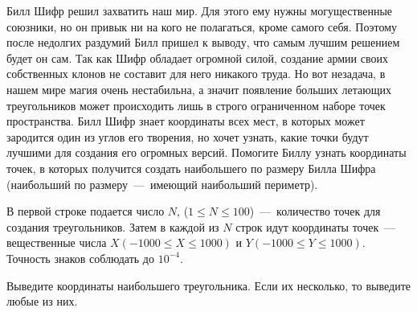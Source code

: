 
Билл Шифр решил захватить наш мир. Для этого ему нужны могущественные союзники, но он привык ни на кого не полагаться, кроме самого себя. Поэтому после недолгих раздумий Билл пришел к выводу, что самым лучшим решением будет он сам. Так как Шифр обладает огромной силой, создание армии своих собственных клонов не составит для него никакого труда. Но вот незадача, в нашем мире магия очень нестабильна, а значит появление больших летающих треугольников может происходить лишь в строго ограниченном наборе точек пространства. Билл Шифр знает координаты всех мест, в которых может зародится один из углов его творения, но хочет узнать, какие точки будут лучшими для создания его огромных версий. Помогите Биллу узнать координаты точек, в которых получится создать наибольшего по размеру Билла Шифра (наибольший по размеру~---~имеющий наибольший периметр). 

\InputFile
В первой строке подается число  $N$, ($1 \le N \le 100$)~---~количество точек для создания треугольников. Затем в каждой из $N$ строк идут координаты точек~---~ вещественные числа $X(-1000 \le X \le 1000)$ и $Y(-1000 \le Y \le 1000)$. Точность знаков соблюдать до $10^{-4}$.

\OutputFile
Выведите координаты наибольшего треугольника. Если их несколько, то выведите любые из них. 

\SAMPLES
